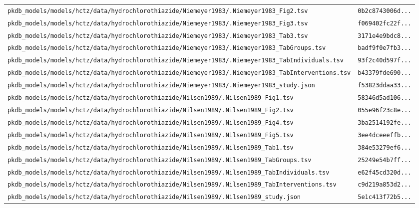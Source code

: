\documentclass{article}
\begin{document}
\begin{longtable}{ll}
\texttt{pkdb\_models/models/hctz/data/hydrochlorothiazide/Niemeyer1983/.Niemeyer1983\_Fig2.tsv} & \texttt{0b2c8743006d...} \\
\texttt{pkdb\_models/models/hctz/data/hydrochlorothiazide/Niemeyer1983/.Niemeyer1983\_Fig3.tsv} & \texttt{f069402fc22f...} \\
\texttt{pkdb\_models/models/hctz/data/hydrochlorothiazide/Niemeyer1983/.Niemeyer1983\_Tab3.tsv} & \texttt{3171e4e9bdc8...} \\
\texttt{pkdb\_models/models/hctz/data/hydrochlorothiazide/Niemeyer1983/.Niemeyer1983\_TabGroups.tsv} & \texttt{badf9f0e7fb3...} \\
\texttt{pkdb\_models/models/hctz/data/hydrochlorothiazide/Niemeyer1983/.Niemeyer1983\_TabIndividuals.tsv} & \texttt{93f2c40d597f...} \\
\texttt{pkdb\_models/models/hctz/data/hydrochlorothiazide/Niemeyer1983/.Niemeyer1983\_TabInterventions.tsv} & \texttt{b43379fde690...} \\
\texttt{pkdb\_models/models/hctz/data/hydrochlorothiazide/Niemeyer1983/.Niemeyer1983\_study.json} & \texttt{f53823ddaa33...} \\
\texttt{pkdb\_models/models/hctz/data/hydrochlorothiazide/Nilsen1989/.Nilsen1989\_Fig1.tsv} & \texttt{58346d5ad106...} \\
\texttt{pkdb\_models/models/hctz/data/hydrochlorothiazide/Nilsen1989/.Nilsen1989\_Fig2.tsv} & \texttt{055e96f23c8e...} \\
\texttt{pkdb\_models/models/hctz/data/hydrochlorothiazide/Nilsen1989/.Nilsen1989\_Fig4.tsv} & \texttt{3ba2514192fe...} \\
\texttt{pkdb\_models/models/hctz/data/hydrochlorothiazide/Nilsen1989/.Nilsen1989\_Fig5.tsv} & \texttt{3ee4dceeeffb...} \\
\texttt{pkdb\_models/models/hctz/data/hydrochlorothiazide/Nilsen1989/.Nilsen1989\_Tab1.tsv} & \texttt{384e53279ef6...} \\
\texttt{pkdb\_models/models/hctz/data/hydrochlorothiazide/Nilsen1989/.Nilsen1989\_TabGroups.tsv} & \texttt{25249e54b7ff...} \\
\texttt{pkdb\_models/models/hctz/data/hydrochlorothiazide/Nilsen1989/.Nilsen1989\_TabIndividuals.tsv} & \texttt{e62f45cd320d...} \\
\texttt{pkdb\_models/models/hctz/data/hydrochlorothiazide/Nilsen1989/.Nilsen1989\_TabInterventions.tsv} & \texttt{c9d219a853d2...} \\
\texttt{pkdb\_models/models/hctz/data/hydrochlorothiazide/Nilsen1989/.Nilsen1989\_study.json} & \texttt{5e1c413f72b5...} \\

\end{longtable}
\end{document}
